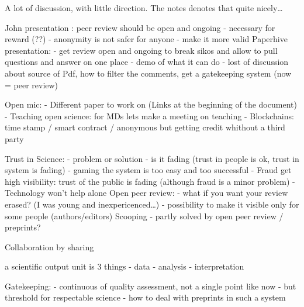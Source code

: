 \documentclass[]{article}
\begin{document}
A lot of discussion, with little direction. The notes denotes that quite
nicely\ldots{}

John presentation : peer review should be open and ongoing - necessary
for reward (??) - anonymity is not safer for anyone - make it more valid
Paperhive presentation: - get review open and ongoing to break sikos and
allow to pull questions and answer on one place - demo of what it can do
- lost of discussion about source of Pdf, how to filter the comments,
get a gatekeeping system (now = peer review)

Open mic: - Different paper to work on (Links at the beginning of the
document) - Teaching open science: for MDs lets make a meeting on
teaching - Blockchains: time stamp / smart contract / anonymous but
getting credit whithout a third party

Trust in Science: - problem or solution - is it fading (trust in people
is ok, trust in system is fading) - gaming the system is too easy and
too successful - Fraud get high visibility: trust of the public is
fading (although fraud is a minor problem) - Technology won't help alone
Open peer review: - what if you want your review erased? (I was young
and inexpericenced\ldots{}) - possibility to make it visible only for
some people (authors/editors) Scooping - partly solved by open peer
review / preprints?

Collaboration by sharing

a scientific output unit is 3 things - data - analysis - interpretation

Gatekeeping: - continuous of quality assessment, not a single point like
now - but threshold for respectable science - how to deal with preprints
in such a system
\end{document}
